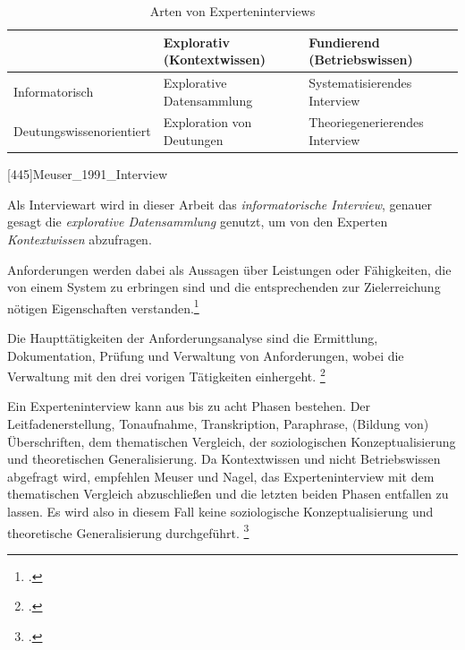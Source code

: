 \begin{table}[H]
\centering
\begin{tabularx}{1\textwidth}{l|X|X}
                            & Explorativ (Kontextwissen) & Fundierend (Betriebswissen) \\\hline
   Informatorisch           & Explorative Datensammlung & Systematisierendes Interview \\
   Deutungswissenorientiert & Exploration von Deutungen & Theoriegenerierendes Interview\\
\end{tabularx}
  [445\psqq]{Meuser_1991_Interview}
\caption{Arten von Experteninterviews}
\label{tab:artenei}
\end{table}




 Als Interviewart wird in dieser Arbeit das \textit{informatorische Interview}, genauer gesagt die \textit{explorative Datensammlung} genutzt, um von den Experten \textit{Kontextwissen} abzufragen.

Anforderungen werden dabei als Aussagen über Leistungen oder Fähigkeiten, die von einem System zu erbringen sind und die entsprechenden zur Zielerreichung nötigen Eigenschaften verstanden.\footcite[Vgl.][3]{Pohl_2015_Requirements}

Die Haupttätigkeiten der Anforderungsanalyse sind die Ermittlung, Dokumentation, Prüfung und Verwaltung von Anforderungen, wobei die Verwaltung mit den drei vorigen Tätigkeiten einhergeht. \footcite[Vgl.][4\psq]{Pohl_2015_Requirements}

Ein Experteninterview kann aus bis zu acht Phasen bestehen. Der Leitfadenerstellung, Tonaufnahme, Transkription, Paraphrase, (Bildung von) Überschriften, dem thematischen Vergleich, der soziologischen Konzeptualisierung und theoretischen Generalisierung.
Da Kontextwissen und nicht Betriebswissen abgefragt wird, empfehlen Meuser und Nagel, das Experteninterview mit dem thematischen Vergleich abzuschließen und die letzten beiden Phasen entfallen zu lassen. Es wird also in diesem Fall keine soziologische Konzeptualisierung und theoretische Generalisierung durchgeführt. \footcite[Vgl.][466\psq]{Meuser_1991_Interview}

